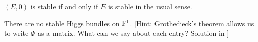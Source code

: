 \documentclass[A4paper, 12pt, british, reqno]{amsart}
\newcommand{\op}{\oplus}
\begin{document}
\begin{rem}
    $(E,0)$ is stable if and only if $E$ is stable in the usual sense.
\end{rem}

\begin{exe}
    There are no stable Higgs bundles on $\P^{1}$.
    [Hint: Grothedieck's theorem allows us to write $\Phi$ as a matrix.
    What can we say about each entry?
    Solution in \cite{hit87a}]
\end{exe}

\end{document}
